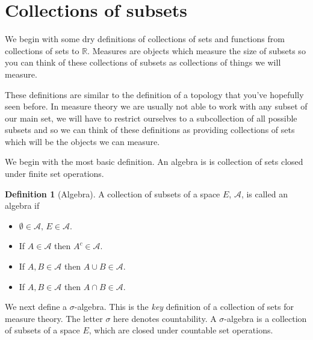 \documentclass[
]{book}
\providecommand{\tightlist}{%
  \setlength{\itemsep}{0pt}\setlength{\parskip}{0pt}}
\theoremstyle{definition}
\newtheorem{definition}{Definition}[chapter]
\theoremstyle{definition}
\theoremstyle{definition}
\theoremstyle{definition}
\theoremstyle{remark}
\begin{document}
\hypertarget{collections-of-subsets}{%
\section{Collections of subsets}\label{collections-of-subsets}}

We begin with some dry definitions of collections of sets and functions from collections of sets to \(\mathbb{R}\). Measures are objects which measure the size of subsets so you can think of these collections of subsets as collections of things we will measure.

These definitions are similar to the definition of a topology that you've hopefully seen before. In measure theory we are usually not able to work with any subset of our main set, we will have to restrict ourselves to a subcollection of all possible subsets and so we can think of these definitions as providing collections of sets which will be the objects we can measure.

We begin with the most basic definition. An algebra is is collection of sets closed under finite set operations.

\begin{definition}[Algebra]

A collection of subsets of a space \(E\), \(\mathcal{A}\), is called an algebra if

\begin{itemize}
\tightlist
\item
  \(\emptyset \in \mathcal{A}, \, E \in \mathcal{A}\).
\item
  If \(A \in \mathcal{A}\) then \(A^c \in \mathcal{A}\).
\item
  If \(A, B \in \mathcal{A}\) then \(A \cup B \in \mathcal{A}\).
\item
  If \(A, B \in \mathcal{A}\) then \(A \cap B \in \mathcal{A}\).
\end{itemize}

\end{definition}

We next define a \(\sigma\)-algebra. This is the \emph{key} definition of a collection of sets for measure theory. The letter \(\sigma\) here denotes countability. A \(\sigma\)-algebra is a collection of subsets of a space \(E\), which are closed under countable set operations.
\end{document}
